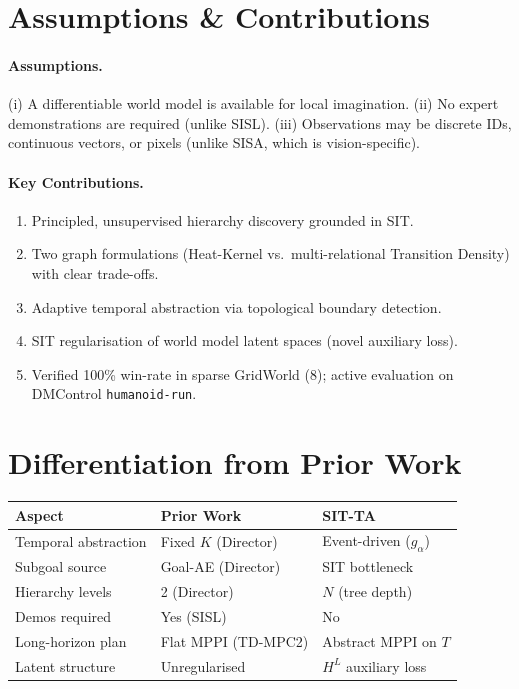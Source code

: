 \documentclass[10pt,twocolumn]{article}
\begin{document}
\section{Assumptions \& Contributions}

\paragraph{Assumptions.}
(i) A differentiable world model is available for local imagination.
(ii) No expert demonstrations are required (unlike SISL).
(iii) Observations may be discrete IDs, continuous vectors, or pixels
(unlike SISA, which is vision-specific).

\paragraph{Key Contributions.}
\begin{enumerate}
  \item Principled, unsupervised hierarchy discovery grounded in SIT.
  \item Two graph formulations (Heat-Kernel vs.\ multi-relational
    Transition Density) with clear trade-offs.
  \item Adaptive temporal abstraction via topological boundary detection.
  \item SIT regularisation of world model latent spaces (novel auxiliary
    loss).
  \item Verified 100\% win-rate in sparse GridWorld (8); active
    evaluation on DMControl \texttt{humanoid-run}.
\end{enumerate}

\section{Differentiation from Prior Work}

\begin{tabular}{@{}lll@{}}
\toprule
Aspect & Prior Work & SIT-TA \\
\midrule
Temporal abstraction & Fixed $K$ (Director) & Event-driven ($g_\alpha$) \\
Subgoal source & Goal-AE (Director) & SIT bottleneck \\
Hierarchy levels & 2 (Director) & $N$ (tree depth) \\
Demos required & Yes (SISL) & No \\
Long-horizon plan & Flat MPPI (TD-MPC2) & Abstract MPPI on $T$ \\
Latent structure & Unregularised & $H^L$ auxiliary loss \\
\bottomrule
\end{tabular}
\end{document}
